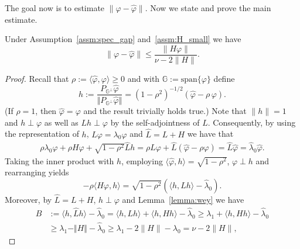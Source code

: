 \documentclass{aptpub}
\newcommand{\lspan}{\mathrm{span}}
\begin{document}
The goal now is to estimate 
$\|\varphi-\widehat \varphi\|$. 
Now we state and prove the main estimate.
\begin{theorem}
    Under Assumption~\ref{assm:spec_gap} and~\ref{assm:H_small} we have
    \begin{equation} \label{eq_thm_bnd_case}
        \|\varphi-\widehat \varphi\| 
        \leq \frac{\| H\varphi \|}{\nu-2\|H\|}.
    \end{equation}
    \label{thm:bdd_case}
\end{theorem}
\begin{proof}
Recall that $\rho := \langle \widehat \varphi, \varphi\rangle \ge 0$ and with $\mathbb{G}:=\lspan\{ \varphi\}$ define
	\begin{equation*}
	h := \frac{P_{\mathbb{G}^\perp} \widehat{\varphi}}{\Vert P_{\mathbb{G}^\perp} \widehat{\varphi} \Vert}
	= (1-\rho^2)^{-1/2} (\widehat \varphi - \rho\, \varphi).
	\end{equation*}
	(If $\rho=1$, then $\widehat \varphi = \varphi$ and the result trivially holds true.) Note that $\|h\|=1$
	and $h\perp \varphi$ as well as $L h \perp \varphi$ by the self-adjointness of $L$. 
 Consequently, by using the representation of $h$, $L\varphi = \lambda_0 \varphi$ and $\widehat L=L+H$ we have that
 \begin{align*}
  \rho \lambda_0 \varphi + \rho H \varphi + \sqrt{1-\rho^2} \widehat L h =
  \rho \widehat L \varphi + \widehat L (\widehat \varphi -\rho \varphi)
  = 
    \widehat L\widehat\varphi
= \widehat{\lambda}_0 \widehat\varphi.
 \end{align*}
Taking the inner product with $h$, employing $\langle \widehat \varphi,h \rangle = \sqrt{1-\rho^2}$, $\varphi\perp h$ and rearranging yields
\begin{equation}
\label{eq: repres}
    -\rho \langle H \varphi, h\rangle = \sqrt{1-\rho^2} \left( \langle h,\widehat L h\rangle -\widehat\lambda_0 \right).
\end{equation}
Moreover, by $\widehat{L}=L+H$, $h\perp \varphi$ and Lemma~\ref{lemma:wey} we have 
\begin{align*}
   B & := \langle h,\widehat{L} h \rangle - \widehat\lambda_0
    = \langle h,L h \rangle + \langle h,H h \rangle - \widehat\lambda_0 
    \geq \lambda_1 + \langle h,H h \rangle - \widehat\lambda_0  \\
    &\geq \lambda_1 - \Vert H \Vert - \widehat\lambda_0
    \geq \lambda_1 - 2\|H\|-\lambda_0=\nu-2\|H\|,

\end{align*}
\end{proof}
\end{document}
